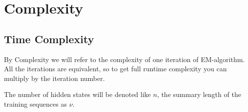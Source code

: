 \documentclass[thesis=M,english]{FITthesis}[2012/10/20]
\begin{document}
\FloatBarrier

\section{Complexity}\label{sec:complex}

\subsection{Time Complexity}

By Complexity we will refer to the complexity of one iteration of EM-algorithm. All the iterations are equivalent, so to get full runtime complexity you can multiply by the iteration number.

The number of hidden states will be denoted like $n$, the summary length of the training sequences as $\nu$. 
\end{document}
